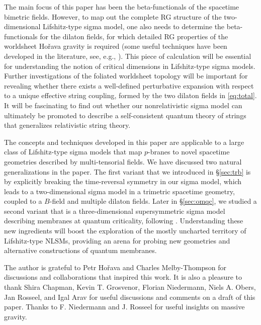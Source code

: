 \documentclass[11pt]{article}
\begin{document}
The main focus of this paper has been the beta-functionals of the spacetime bimetric fields. However, to map out the complete RG structure of the two-dimensional Lifshitz-type sigma model, one also needs to determine the beta-functionals for the dilaton fields, for which detailed RG properties of the worldsheet Ho\v{r}ava gravity is required (some useful techniques have been developed in the literature, see, e.g., \cite{DOdorico:2015pil, Barvinsky:2015kil, Griffin:2017wvh, Barvinsky:2017mal, Barvinsky:2017kob, Grosvenor:2021zvq}). This piece of calculation will be essential for understanding the notion of critical dimensions in Lifshitz-type sigma models. Further investigations of the foliated worldsheet topology will be important for revealing whether there exists a well-defined perturbative expansion with respect to a unique effective string coupling, formed by the two dilaton fields in \eqref{eq:total}. It will be fascinating to find out whether our nonrelativistic sigma model can ultimately be promoted to describe a self-consistent quantum theory of strings that generalizes relativistic string theory.

The concepts and techniques developed in this paper are applicable to a large class of Lifshitz-type sigma models that map $p$-branes to novel spacetime geometries described by multi-tensorial fields. We have discussed two natural generalizations in the paper. The first variant that we introduced in \S\ref{sec:trb} is by explicitly breaking the time-reversal symmetry in our sigma model, which leads to a two-dimensional sigma model in a trimetric spacetime geometry, coupled to a $B$-field and multiple dilaton fields. Later in \S\ref{sec:omqc}, we studied a second variant that is a three-dimensional supersymmetric sigma model describing membranes at quantum criticality, following \cite{ssl, as}. Understanding these new ingredients will boost the exploration of the mostly uncharted territory of Lifshitz-type NLSMs, providing an arena for probing new geometries and alternative constructions of quantum membranes. 

\acknowledgments

The author is grateful to Petr Ho\v{r}ava and Charles Melby-Thompson for discussions and collaborations that inspired this work. It is also a pleasure to thank Shira Chapman, Kevin T. Grosvenor, Florian Niedermann, Niels A. Obers, Jan Rosseel, and Igal Arav for useful discussions and comments on a draft of this paper. Thanks to F. Niedermann and J. Rosseel for useful insights on massive gravity. 
\end{document}
